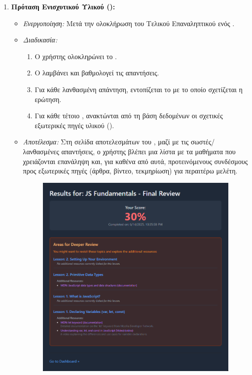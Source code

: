 \begin{enumerate}[leftmargin=*, label=\arabic*., wide, labelwidth=!, labelindent=0pt, itemsep=1ex]
    \item \textbf{Πρόταση Ενισχυτικού Υλικού ():}
        \begin{itemize}[leftmargin=1.5em, noitemsep]
            \item \textit{Ενεργοποίηση:} Μετά την ολοκλήρωση του Τελικού Επαναληπτικού  ενός .
            \item \textit{Διαδικασία:}
            \begin{enumerate}[leftmargin=1.5em, label=\alph*), noitemsep]
                \item Ο χρήστης ολοκληρώνει το .
                \item Ο \texttt{} λαμβάνει και βαθμολογεί τις απαντήσεις.
                \item Για κάθε λανθασμένη απάντηση, εντοπίζεται το \texttt{} με το οποίο σχετίζεται η ερώτηση.
                \item Για κάθε τέτοιο , ανακτώνται από τη βάση δεδομένων οι σχετικές εξωτερικές πηγές υλικού (\texttt{}).
            \end{enumerate}
            \item \textit{Αποτέλεσμα:} Στη σελίδα αποτελεσμάτων του , μαζί με τις σωστές/λανθασμένες απαντήσεις, ο χρήστης βλέπει μια λίστα με τα μαθήματα που χρειάζονται επανάληψη και, για καθένα από αυτά, προτεινόμενους συνδέσμους προς εξωτερικές πηγές (άρθρα, βίντεο, τεκμηρίωση) για περαιτέρω μελέτη.
            \begin{figure}[h!]
              \centering
              \includegraphics[scale=0.3]{images/final_review.png}

\end{figure}
\end{itemize}
\end{enumerate}
